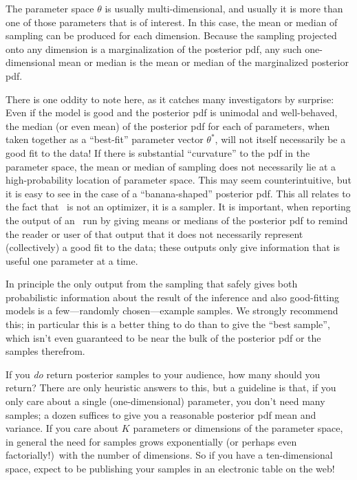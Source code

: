 \documentclass[modern]{aastex61}
\newcommand{\MCMC}{\acronym{MCMC}}
\newcommand{\pars}{\theta}
\begin{document}
The parameter space $\pars$ is usually multi-dimensional, and usually it is more
than one of those parameters that is of interest.
In this case, the mean or median of sampling can be produced for each
dimension.
Because the sampling projected onto any dimension is a marginalization
of the posterior pdf, any such one-dimensional mean or median is the
mean or median of the marginalized posterior pdf.

There is one oddity to note here, as it catches many investigators by
surprise:
Even if the model is good and the posterior pdf is unimodal and well-behaved,
the median (or even mean) of the posterior pdf for each of parameters,
when taken together as a ``best-fit'' parameter vector $\pars^\ast$,
will not itself necessarily be a good fit to the data!
If there is substantial ``curvature'' to the pdf in the parameter
space, the mean or median of sampling does not necessarily lie at a
high-probability location of parameter space.
This may seem counterintuitive, but it is easy to see in the case of a
``banana-shaped'' posterior pdf.
This all relates to the fact that \MCMC\ is not an optimizer, it is a
sampler.
It is important, when reporting the output of an \MCMC\ run by giving
means or medians of the posterior pdf to remind the reader or user of
that output that it does not necessarily represent (collectively) a
good fit to the data; these outputs only give information that is
useful one parameter at a time.

In principle the only output from the sampling that safely gives both
probabilistic information about the result of the inference and also
good-fitting models is a few---randomly chosen---example samples.
We strongly recommend this; in
particular this is a better thing to do than to give the ``best
sample'', which isn't even guaranteed to be near the bulk of the
posterior pdf or the samples therefrom.

If you \emph{do} return posterior samples to your audience, how many
should you return?
There are only heuristic answers to this, but a guideline is that, if
you only care about a single (one-dimensional) parameter, you don't
need many samples; a dozen suffices to give you a reasonable posterior
pdf mean and variance.
If you care about $K$ parameters or dimensions of the parameter space,
in general the need for samples grows exponentially (or perhaps even
factorially!)\ with the number of dimensions.
So if you have a ten-dimensional space, expect to be publishing your
samples in an electronic table on the web!
\end{document}
